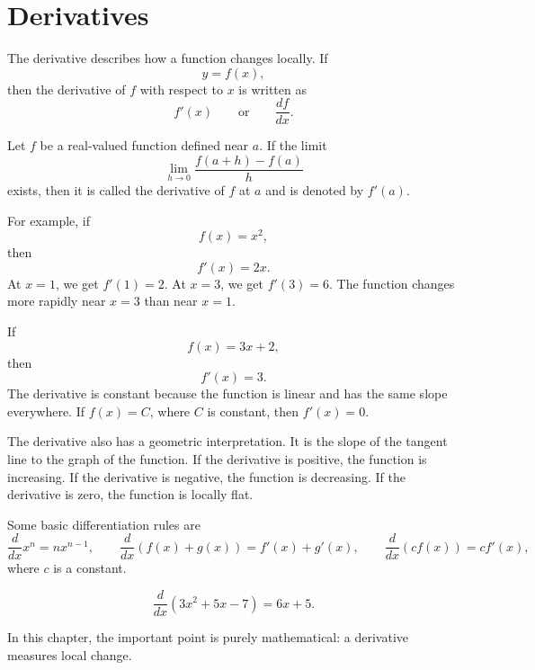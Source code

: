 \section{Derivatives}

The derivative describes how a function changes locally. If
\[
y=f(x),
\]
then the derivative of \(f\) with respect to \(x\) is written as
\[
f'(x)
\qquad\text{or}\qquad
\frac{df}{dx}.
\]

\begin{definitionbox}
Let \(f\) be a real-valued function defined near \(a\). If the limit
\[
\lim_{h\to 0}\frac{f(a+h)-f(a)}{h}
\]
exists, then it is called the derivative of \(f\) at \(a\) and is denoted by \(f'(a)\).
\end{definitionbox}

For example, if
\[
f(x)=x^2,
\]
then
\[
f'(x)=2x.
\]
At \(x=1\), we get \(f'(1)=2\). At \(x=3\), we get \(f'(3)=6\). The function changes more rapidly near \(x=3\) than near \(x=1\).

If
\[
f(x)=3x+2,
\]
then
\[
f'(x)=3.
\]
The derivative is constant because the function is linear and has the same slope everywhere. If \(f(x)=C\), where \(C\) is constant, then \(f'(x)=0\).

The derivative also has a geometric interpretation. It is the slope of the tangent line to the graph of the function. If the derivative is positive, the function is increasing. If the derivative is negative, the function is decreasing. If the derivative is zero, the function is locally flat.

Some basic differentiation rules are
\[
\frac{d}{dx}x^n=nx^{n-1},
\qquad
\frac{d}{dx}(f(x)+g(x))=f'(x)+g'(x),
\qquad
\frac{d}{dx}(cf(x))=cf'(x),
\]
where \(c\) is a constant.

\begin{examplebox}
\[
\frac{d}{dx}(3x^2+5x-7)=6x+5.
\]
\end{examplebox}

In this chapter, the important point is purely mathematical: a derivative measures local change.

